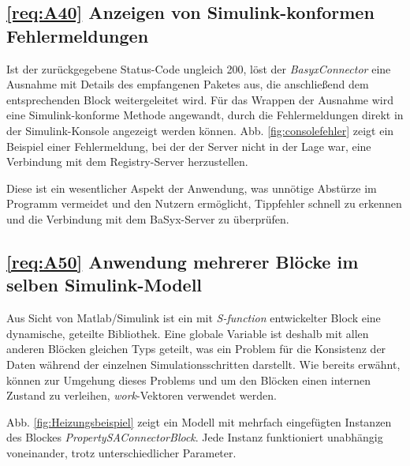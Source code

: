 

\subsection{\ref{req:A40} Anzeigen von Simulink-konformen Fehlermeldungen} \label{ProzessA4}

Ist der zurückgegebene Status-Code ungleich 200, löst der \textit{BasyxConnector} eine Ausnahme mit Details des empfangenen Paketes aus, die anschließend dem entsprechenden Block weitergeleitet wird. Für das Wrappen der Ausnahme wird eine Simulink-konforme Methode angewandt, durch die Fehlermeldungen direkt in der Simulink-Konsole angezeigt werden können. Abb. \ref{fig:consolefehler} zeigt ein Beispiel einer Fehlermeldung, bei der der Server nicht in der Lage war, eine Verbindung mit dem Registry-Server herzustellen.



Diese ist ein wesentlicher Aspekt der Anwendung, was unnötige Abstürze im Programm vermeidet und den Nutzern ermöglicht, Tippfehler schnell zu erkennen und die Verbindung mit dem BaSyx-Server zu überprüfen.

\subsection{\ref{req:A50} Anwendung mehrerer Blöcke im selben Simulink-Modell}

Aus Sicht von Matlab/Simulink ist ein mit \textit{S-function} entwickelter Block eine dynamische, geteilte Bibliothek. Eine globale Variable ist deshalb mit allen anderen Blöcken gleichen Typs geteilt, was ein Problem für die Konsistenz der Daten während der einzelnen Simulationsschritten darstellt. Wie bereits erwähnt, können zur Umgehung dieses Problems und um den Blöcken einen internen Zustand zu verleihen, \textit{work}-Vektoren verwendet werden.

Abb. \ref{fig:Heizungsbeispiel} zeigt ein Modell mit mehrfach eingefügten Instanzen des Blockes \textit{PropertySAConnectorBlock}. Jede Instanz funktioniert unabhängig voneinander, trotz unterschiedlicher Parameter. 

